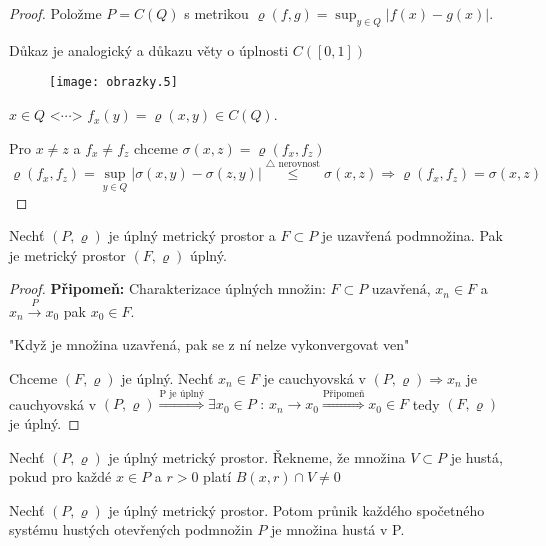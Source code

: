 \begin{proof}
Položme $P = C(Q)$ s metrikou $\varrho (f,g) = \sup_{y \in Q} | f(x)-g(x) |$. 

\begin{poznamka} 
Důkaz je analogický a důkazu věty o úplnosti $C([0,1])$
\end{poznamka}

\begin{figure}[!h] \begin{center}
\texttt{[image: obrazky.5]}
\end{center} \end{figure}

$x \in Q \textrm{ <$\cdots$> } f_x(y) = \varrho(x,y) \in C(Q)$. 

Pro $x \neq z$ a $f_x \neq f_z$ chceme $\sigma (x,z) = \varrho (f_x, f_z)$
$$\varrho (f_x, f_z) = \sup_{y \in Q} | \sigma (x,y) - \sigma (z,y) | \overset{\textrm{$\triangle$ nerovnost}}{\leq} \sigma (x,z) \Rightarrow \varrho (f_x, f_z) = \sigma(x,z)$$ 
\end{proof}


\begin{vetal}
Nechť $(P, \varrho)$ je úplný metrický prostor a $F \subset P$ je uzavřená podmnožina. Pak je metrický prostor $(F, \varrho)$ úplný.
\end{vetal}

\begin{proof}
\textbf{Připomeň: } Charakterizace úplných množin: $F \subset P \textrm{ uzavřená}$, $x_n \in F$ a $x_n \overset{P}{\to} x_0$ pak $x_0 \in F$. 

"Když je množina uzavřená, pak se z ní nelze vykonvergovat ven"

Chceme $(F, \varrho)$ je úplný. Nechť $x_n \in F$ je cauchyovská v $(P, \varrho)\Rightarrow x_n$ je cauchyovská v $(P, \varrho) \overset{\textrm{P je úplný}}{\Rightarrow} \exists x_0 \in P \textrm{ : } x_n \to x_0 \overset{\textrm{Připomeň}}{\Rightarrow} x_0 \in F$ tedy $(F, \varrho)$ je úplný.
\end{proof}

\begin{definice}
Nechť $(P, \varrho)$ je úplný metrický prostor. Řekneme, že množina $V \subset P$ je hustá, pokud pro každé $x \in P$ a $r > 0$ platí $B(x,r) \cap V \neq 0$
\end{definice}

\begin{vetat}[Baire]
\label{Baire}
Nechť $(P, \varrho)$ je úplný metrický prostor. Potom průnik každého spočetného systému hustých otevřených podmnožin $P$ je množina hustá v P.
\end{vetat}


